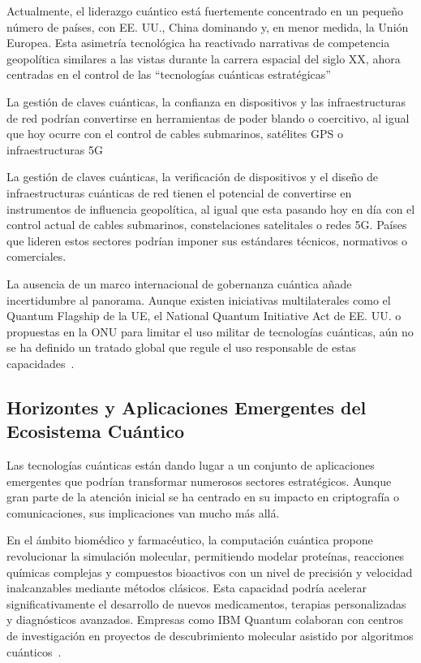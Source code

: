 Actualmente, el liderazgo cuántico está fuertemente concentrado en un pequeño número de países, con EE. UU., China dominando y, en menor medida, la Unión Europea. Esta asimetría tecnológica ha reactivado narrativas de competencia geopolítica similares a las vistas durante la carrera espacial del siglo XX, ahora centradas en el control de las “tecnologías cuánticas estratégicas”

La gestión de claves cuánticas, la confianza en dispositivos y las infraestructuras de red podrían convertirse en herramientas de poder blando o coercitivo, al igual que hoy ocurre con el control de cables submarinos, satélites GPS o infraestructuras 5G

La gestión de claves cuánticas, la verificación de dispositivos y el diseño de infraestructuras cuánticas de red tienen el potencial de convertirse en instrumentos de influencia geopolítica, al igual que esta pasando hoy en día con el control actual de cables submarinos, constelaciones satelitales o redes 5G. Países que lideren estos sectores podrían imponer sus estándares técnicos, normativos o comerciales.

La ausencia de un marco internacional de gobernanza cuántica añade incertidumbre al panorama. Aunque existen iniciativas multilaterales como el Quantum Flagship de la UE, el National Quantum Initiative Act de EE. UU. o propuestas en la ONU para limitar el uso militar de tecnologías cuánticas, aún no se ha definido un tratado global que regule el uso responsable de estas capacidades~\cite{PostQuantum2025}.

\subsection {Horizontes y Aplicaciones Emergentes del Ecosistema Cuántico}
Las tecnologías cuánticas están dando lugar a un conjunto de aplicaciones emergentes que podrían transformar numerosos sectores estratégicos. Aunque gran parte de la atención inicial se ha centrado en su impacto en criptografía o comunicaciones, sus implicaciones van mucho más allá.

En el ámbito biomédico y farmacéutico, la computación cuántica propone revolucionar la simulación molecular, permitiendo modelar proteínas, reacciones químicas complejas y compuestos bioactivos con un nivel de precisión y velocidad inalcanzables mediante métodos clásicos. Esta capacidad podría acelerar significativamente el desarrollo de nuevos medicamentos, terapias personalizadas y diagnósticos avanzados. Empresas como IBM Quantum colaboran con centros de investigación en proyectos de descubrimiento molecular asistido por algoritmos cuánticos~\cite{ClevelandClinic2024}.

